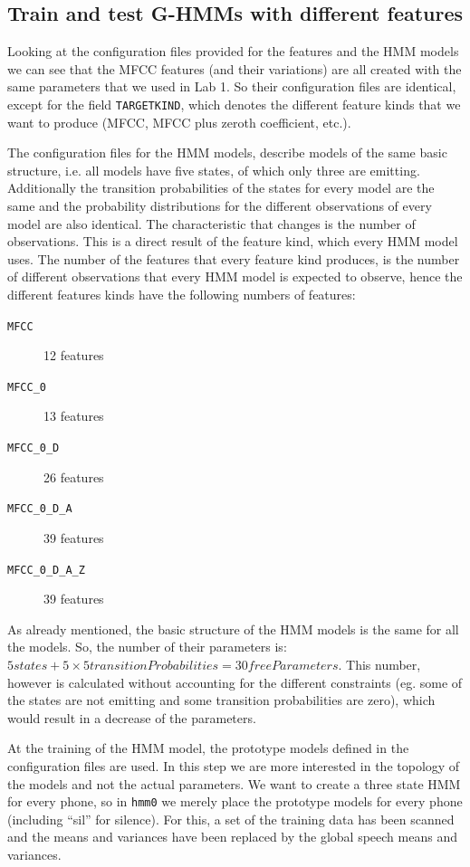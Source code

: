\documentclass[12pt,a4paper,oneside]{article}
\begin{document}
\subsection{Train and test G-HMMs with different features} \label{sec:ghmm}
Looking at the configuration files provided for the features and the HMM models we can see that the MFCC features (and their variations) are all created with the same parameters that we used in Lab 1. So their configuration files are identical, except for the field \texttt{TARGETKIND}, which denotes the different feature kinds that we want to produce (MFCC, MFCC plus zeroth coefficient, etc.).

The configuration files for the HMM models, describe models of the same basic structure, i.e. all models have five states, of which only three are emitting. Additionally the transition probabilities of the states for every model are the same and the probability distributions for the different observations of every model are also identical. The characteristic that changes is the number of observations. This is a direct result of the feature kind, which every HMM model uses. The number of the features that every feature kind produces, is the number of different observations that every HMM model is expected to observe, hence the different features kinds have the following numbers of features:
\begin{description}
\item[\texttt{MFCC}] 12 features
\item[\texttt{MFCC\_0}] 13 features
\item[\texttt{MFCC\_0\_D}] 26 features
\item[\texttt{MFCC\_0\_D\_A}] 39 features
\item[\texttt{MFCC\_0\_D\_A\_Z}] 39 features
\end{description}
As already mentioned, the basic structure of the HMM models is the same for all the models. So, the number of their parameters is: $5 states + 5\times5 transitionProbabilities = 30freeParameters$. This number, however is calculated without accounting for the different constraints (eg. some of the states are not emitting and some transition probabilities are zero), which would result in a decrease of the parameters.

At the training of the HMM model, the prototype models defined in the configuration files are used. In this step we are more interested in the topology of the models and not the actual parameters. We want to create a three state HMM for every phone, so in \texttt{hmm0} we merely place the prototype models for every phone (including ``sil'' for silence). For this, a set of the training data has been scanned and the means and variances have been replaced by the global speech means and variances.
\end{document}
